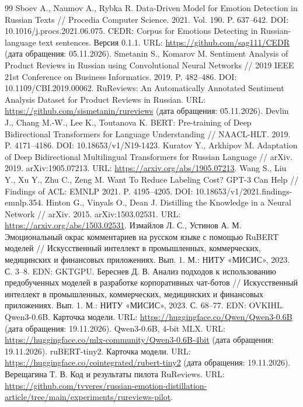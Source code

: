 \documentclass{misisarticle}
\begin{document}
\clearpage
\begin{thebibliography}{99}
 Sboev A., Naumov A., Rybka R. Data-Driven Model for Emotion Detection in Russian Texts // Procedia Computer Science. 2021. Vol. 190. P. 637--642. DOI: 10.1016/j.procs.2021.06.075.
 CEDR: Corpus for Emotions Detecting in Russian-language text sentences. Версия 0.1.1. URL: \url{https://github.com/sag111/CEDR} (дата обращения: 05.11.2026).
 Smetanin S., Komarov M. Sentiment Analysis of Product Reviews in Russian using Convolutional Neural Networks // 2019 IEEE 21st Conference on Business Informatics. 2019. P. 482--486. DOI: 10.1109/CBI.2019.00062.
 RuReviews: An Automatically Annotated Sentiment Analysis Dataset for Product Reviews in Russian. URL: \url{https://github.com/sismetanin/rureviews} (дата обращения: 05.11.2026).
 Devlin J., Chang M.-W., Lee K., Toutanova K. BERT: Pre-training of Deep Bidirectional Transformers for Language Understanding // NAACL-HLT. 2019. P. 4171--4186. DOI: 10.18653/v1/N19-1423.
 Kuratov Y., Arkhipov M. Adaptation of Deep Bidirectional Multilingual Transformers for Russian Language // arXiv. 2019. arXiv:1905.07213. URL: \url{https://arxiv.org/abs/1905.07213}.
 Wang S., Liu Y., Xu Y., Zhu C., Zeng M. Want To Reduce Labeling Cost? GPT-3 Can Help // Findings of ACL: EMNLP 2021. P. 4195--4205. DOI: 10.18653/v1/2021.findings-emnlp.354.
 Hinton G., Vinyals O., Dean J. Distilling the Knowledge in a Neural Network // arXiv. 2015. arXiv:1503.02531. URL: \url{https://arxiv.org/abs/1503.02531}.
 Измайлов Л. С., Устинов А. М. Эмоциональный окрас комментариев на русском языке с помощью RuBERT моделей // Искусственный интеллект в промышленных, коммерческих, медицинских и финансовых приложениях. Вып. 1. М.: НИТУ «МИСИС», 2023. С. 3--8. EDN: GKTGPU.
 Береснев Д. В. Анализ подходов к использованию предобученных моделей в разработке корпоративных чат-ботов // Искусственный интеллект в промышленных, коммерческих, медицинских и финансовых приложениях. Вып. 1. М.: НИТУ «МИСИС», 2023. С. 68--77. EDN: OVKIHL.
 Qwen3-0.6B. Карточка модели. URL: \url{https://huggingface.co/Qwen/Qwen3-0.6B} (дата обращения: 19.11.2026).
 Qwen3-0.6B, 4-bit MLX. URL: \url{https://huggingface.co/mlx-community/Qwen3-0.6B-4bit} (дата обращения: 19.11.2026).
 ruBERT-tiny2. Карточка модели. URL: \url{https://huggingface.co/cointegrated/rubert-tiny2} (дата обращения: 19.11.2026).
 Верещагина Т. В. Код и результаты пилота RuReviews. URL: \url{https://github.com/tvveres/russian-emotion-distillation-article/tree/main/experiments/rureviews-pilot}.
\end{thebibliography}
\end{document}

